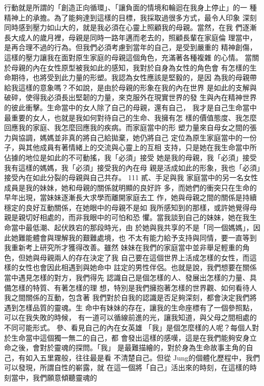 行動就是所謂的「創造正向循環」、「讓負面的情境和輪迴在我身上停止」的一
種精神上的承擔。為了能夠達到這樣的目標，我採取過很多方式，最令人印象
深刻同時感到壓力如山大的，就是我必須在心靈上照顧我的母親。當然，在我
們逐漸長大成人的歲月裡，母親是同時一路年邁而老去的，照顧長輩在家庭倫
理當中，是再合理不過的行為。但我們必須考慮到當年的自己，是受到嚴重的
精神創傷，這樣的壓力讓我在面對原生家庭的母親這個角色，充滿著各種複雜
的心情。 
當關於母親的內在女性原型被我如此的感知，我對於自身為女性的角色會
有怎樣的生命期待，也將受到此力量的形塑。我認為女性應該是堅毅的，是因
為我的母親帶給我這樣的意象嗎？不如說，是由於母親的形象在我的內在世界
是如此的支解與破碎，使得我必須長出堅韌的力量，來克服外在現實世界的發
生與內在精神世界的彼此衝擊。生命當中的女人除了自己的母親，還有自己，
我才是自己生命當中最重要的女人，也就是我如何對待自己的生命、我擁有怎
樣的價值態度、我怎麼回應我的家庭、我怎麼回應我的疾病。而家庭當中的形
塑力量來自母女之間的張力與協調，媽媽並非真的將自己給拋棄，她仍將自己
定位為原生家庭當中的一份子，與其他成員有著情緒上的交流與心靈上的互相
支持，只是她在我生命當中所佔據的地位是如此的不可動搖，我「必須」接受
她是我的母親，我「必須」接受我有這樣的媽媽，我「必須」接受我的內在母
親是活成如此的形象，我也「必須」接受內在如此分裂的母親與自己共存。 
111 
貳、手足與我 
家庭當中的另一名女性成員是我的妹妹，她和母親的關係就明顯的良好許
多，而她們的衝突只在生命的早年出現，當妹妹逐漸長大求學而離開家庭去工
作，她與母親之間的關係是持續穩定的良好互動關係，在她眼中的母親不是如
我所感知到的那樣，或許她覺得母親是親切好相處的，而非我眼中的可怕和恐
懼。當我談到自己的妹妹，她在我生命當中最低潮、起伏跌宕的那段時光，由
於她與我共享的不是「同一個媽媽」，因此她難能體會與理解我的艱難處境，也
不太有能力給予支持與同情，要一直等到我重新考上研究所才獲得改善。雖然
妹妹在我們的家庭當中並非舉足輕重的角色，但她與母親兩人的存在決定了我
自己要在這個世界上活成怎樣的女性，而這樣的女性也會因此相遇到與她命中
註定的男性伴侶。也就是說，我們想要在關係當中遇見怎樣的對方，我們得先
認識自己是個怎樣的人、發展出怎樣的力量、具備怎樣的特質、有著怎樣的理
想，特別是我們擁抱著怎樣的世界觀、如何看待人我之間關係的互動，包含著
我們對於自我的認識是否足夠深刻，都會決定我們將遇到怎樣品質的靈魂。生
命中有妹妹的存在，讓我的生命座標有了一個參照點，可以在我失敗的時候，
有一道可以循線前進的光，讓我知道，與父母之間相處的不同可能形式。 
參、看見自己的內在女英雄 
「我」是個怎麼樣的人呢？每個人對於生命當中這個獨一無二的自己，都
會發出這樣的感嘆，這是在我們能夠安身立命之後，會對於靈魂的探問。「我」
是最難描繪的，對於身為生命故事主角的自己，有如入五里霧般，往往最是看
不清楚自己。但從 Jung的個體化歷程中，我們可以發現，所謂自性的嶄露，就
在這一個將「自己」活出來的時刻，在這樣的時刻當中，我們願意傾聽靈魂的
